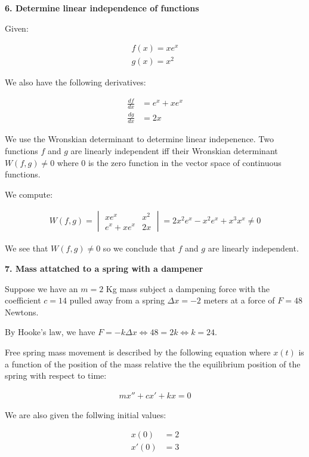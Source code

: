 \documentclass[12pt]{article}
\begin{document}
\medskip

\textbf{6. Determine linear independence of functions}

Given:

\begin{align}
	f(x) = xe^x \\
	g(x) = x^2
\end{align}

We also have the following derivatives:

\begin{align}
	\frac{df}{dx} & = e^x + xe^x \\
	\frac{dg}{dx} & = 2x
\end{align}

We use the Wronskian determinant to determine linear indepenence.
Two functions $f$ and $g$ are linearly independent
iff their Wronskian determinant $W(f,g) \neq 0$
where $0$ is the zero function in the vector space
of continuous functions.

We compute:

\begin{align}
	W(f,g) = \begin{vmatrix} xe^x & x^2 \\
	e^x+xe^x & 2x \end{vmatrix} =
	2x^2e^x-x^2e^x+x^3x^x \neq 0
\end{align}

We see that $W(f,g) \neq 0$
so we conclude that $f$ and $g$ are linearly independent.

\medskip

\textbf{7. Mass attatched to a spring with a dampener}

Suppose we have an $m = 2$ Kg mass subject
a dampening force with the coefficient $c = 14$
pulled away from a spring $ \Delta x = -2$ meters
at a force of $F = 48$ Newtons.

By Hooke's law, we have $F = -k \Delta x \iff 48 = 2k \iff k = 24$.

Free spring mass movement is described by the following equation
where $x(t)$ is a function of the position of the mass
relative the the equilibrium position of the spring
with respect to time:

\begin{align}
	\label{g7.1}
	mx'' + cx' + kx = 0
\end{align}

We are also given the follwing initial values:

\begin{align}
	x(0) & = 2 \\
	x'(0) & = 3
\end{align}
\end{document}
